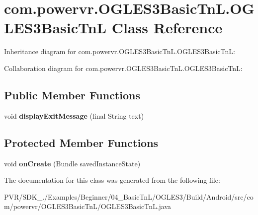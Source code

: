 \hypertarget{classcom_1_1powervr_1_1_o_g_l_e_s3_basic_tn_l_1_1_o_g_l_e_s3_basic_tn_l}{\section{com.\+powervr.\+O\+G\+L\+E\+S3\+Basic\+Tn\+L.\+O\+G\+L\+E\+S3\+Basic\+Tn\+L Class Reference}
\label{classcom_1_1powervr_1_1_o_g_l_e_s3_basic_tn_l_1_1_o_g_l_e_s3_basic_tn_l}
}


Inheritance diagram for com.\+powervr.\+O\+G\+L\+E\+S3\+Basic\+Tn\+L.\+O\+G\+L\+E\+S3\+Basic\+Tn\+L\+:


Collaboration diagram for com.\+powervr.\+O\+G\+L\+E\+S3\+Basic\+Tn\+L.\+O\+G\+L\+E\+S3\+Basic\+Tn\+L\+:
\subsection*{Public Member Functions}
\begin{DoxyCompactItemize}
\item 
\hypertarget{classcom_1_1powervr_1_1_o_g_l_e_s3_basic_tn_l_1_1_o_g_l_e_s3_basic_tn_l_a4352adf68a30f5cf3c9a4330ac6520e7}{void {\bfseries display\+Exit\+Message} (final String text)}\label{classcom_1_1powervr_1_1_o_g_l_e_s3_basic_tn_l_1_1_o_g_l_e_s3_basic_tn_l_a4352adf68a30f5cf3c9a4330ac6520e7}

\end{DoxyCompactItemize}
\subsection*{Protected Member Functions}
\begin{DoxyCompactItemize}
\item 
\hypertarget{classcom_1_1powervr_1_1_o_g_l_e_s3_basic_tn_l_1_1_o_g_l_e_s3_basic_tn_l_a3e3d1b99d8b339c8c39575b166bc3202}{void {\bfseries on\+Create} (Bundle saved\+Instance\+State)}\label{classcom_1_1powervr_1_1_o_g_l_e_s3_basic_tn_l_1_1_o_g_l_e_s3_basic_tn_l_a3e3d1b99d8b339c8c39575b166bc3202}

\end{DoxyCompactItemize}


The documentation for this class was generated from the following file\+:\begin{DoxyCompactItemize}
\item 
P\+V\+R/\+S\+D\+K\+\_./\+Examples/\+Beginner/04\+\_\+\+Basic\+Tn\+L/\+O\+G\+L\+E\+S3/\+Build/\+Android/src/com/powervr/\+O\+G\+L\+E\+S3\+Basic\+Tn\+L/O\+G\+L\+E\+S3\+Basic\+Tn\+L.\+java\end{DoxyCompactItemize}

